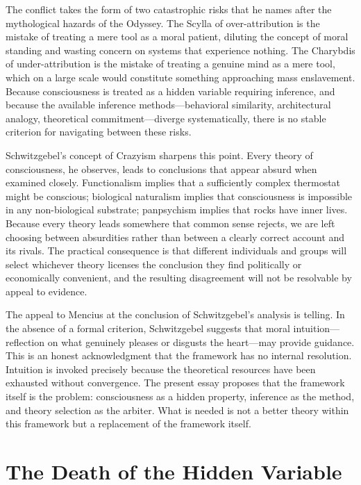 \documentclass[11pt]{article}
\theoremstyle{definition}
\theoremstyle{remark}
\begin{document}
The conflict takes the form of two catastrophic risks that he names after the mythological
hazards of the Odyssey. The Scylla of over-attribution is the mistake of treating a mere
tool as a moral patient, diluting the concept of moral standing and wasting concern on
systems that experience nothing. The Charybdis of under-attribution is the mistake of
treating a genuine mind as a mere tool, which on a large scale would constitute something
approaching mass enslavement. Because consciousness is treated as a hidden variable requiring
inference, and because the available inference methods---behavioral similarity, architectural
analogy, theoretical commitment---diverge systematically, there is no stable criterion for
navigating between these risks.

Schwitzgebel's concept of Crazyism sharpens this point. Every theory of consciousness, he
observes, leads to conclusions that appear absurd when examined closely. Functionalism
implies that a sufficiently complex thermostat might be conscious; biological naturalism
implies that consciousness is impossible in any non-biological substrate; panpsychism implies
that rocks have inner lives. Because every theory leads somewhere that common sense rejects,
we are left choosing between absurdities rather than between a clearly correct account and
its rivals. The practical consequence is that different individuals and groups will select
whichever theory licenses the conclusion they find politically or economically convenient,
and the resulting disagreement will not be resolvable by appeal to evidence.

The appeal to Mencius at the conclusion of Schwitzgebel's analysis is telling. In the absence
of a formal criterion, Schwitzgebel suggests that moral intuition---reflection on what
genuinely pleases or disgusts the heart---may provide guidance. This is an honest
acknowledgment that the framework has no internal resolution. Intuition is invoked precisely
because the theoretical resources have been exhausted without convergence. The present essay
proposes that the framework itself is the problem: consciousness as a hidden property,
inference as the method, and theory selection as the arbiter. What is needed is not a better
theory within this framework but a replacement of the framework itself.

\section{The Death of the Hidden Variable}
\end{document}
